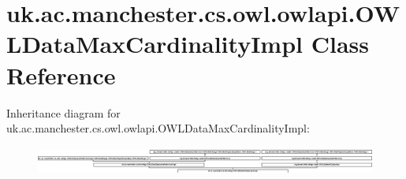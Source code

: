 \hypertarget{classuk_1_1ac_1_1manchester_1_1cs_1_1owl_1_1owlapi_1_1_o_w_l_data_max_cardinality_impl}{\section{uk.\-ac.\-manchester.\-cs.\-owl.\-owlapi.\-O\-W\-L\-Data\-Max\-Cardinality\-Impl Class Reference}
\label{classuk_1_1ac_1_1manchester_1_1cs_1_1owl_1_1owlapi_1_1_o_w_l_data_max_cardinality_impl}
}
Inheritance diagram for uk.\-ac.\-manchester.\-cs.\-owl.\-owlapi.\-O\-W\-L\-Data\-Max\-Cardinality\-Impl\-:\begin{figure}[H]
\begin{center}
\leavevmode
\includegraphics[height=0.965934cm]{classuk_1_1ac_1_1manchester_1_1cs_1_1owl_1_1owlapi_1_1_o_w_l_data_max_cardinality_impl}
\end{center}
\end{figure}
